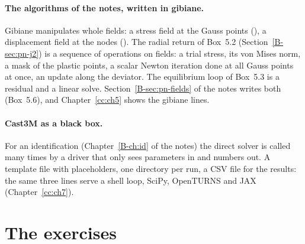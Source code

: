 \paragraph{The algorithms of the notes, written in gibiane.}
Gibiane manipulates whole fields: a stress field at the Gauss points
(), a displacement field at the nodes (). The radial
return of Box~5.2 (Section~\ref{B-sec:pn-j2}) is a sequence of operations on fields: a
trial stress, its von Mises norm, a mask of the plastic points, a scalar
Newton iteration done at all Gauss points at once, an update along the
deviator. The equilibrium loop of Box~5.3 is a residual and a linear solve.
Section~\ref{B-sec:pn-fields} of the notes writes both (Box~5.6), and
Chapter~\ref{cc:ch5} shows the gibiane lines.

\paragraph{Cast3M as a black box.}
For an identification (Chapter~\ref{B-ch:id} of the notes) the direct solver
is called many times by a driver that only sees parameters in and numbers
out. A template file with placeholders, one directory per run, a CSV file for
the results: the same three lines serve a shell loop, SciPy, OpenTURNS and
JAX (Chapter~\ref{cc:ch7}).

\section{The exercises}\label{cc:sec-list}

